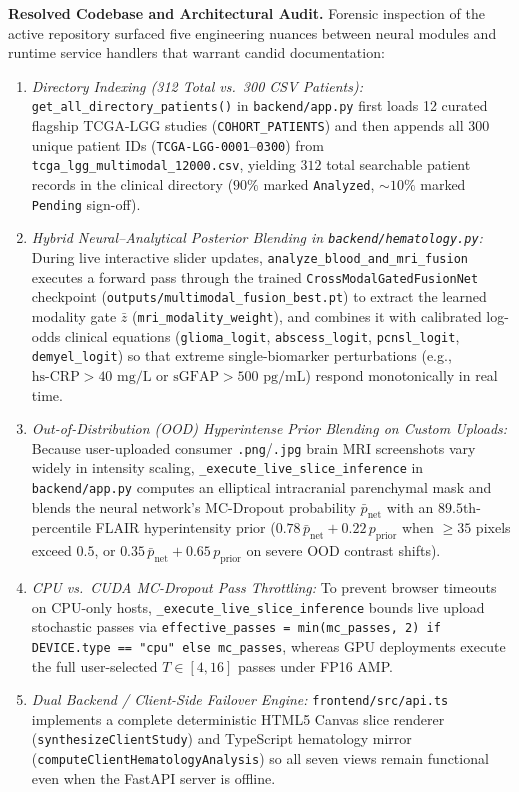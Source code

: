 \documentclass[journal,onecolumn,10pt]{IEEEtran}
\begin{document}
\textbf{Resolved Codebase and Architectural Audit.} Forensic inspection of the active repository surfaced five engineering nuances between neural modules and runtime service handlers that warrant candid documentation:
\begin{enumerate}
    \item \textit{Directory Indexing (312 Total vs.\ 300 CSV Patients):} \texttt{get\_all\_directory\_patients()} in \texttt{backend/app.py} first loads 12 curated flagship TCGA-LGG studies (\texttt{COHORT\_PATIENTS}) and then appends all 300 unique patient IDs (\texttt{TCGA-LGG-0001}--\texttt{0300}) from \texttt{tcga\_lgg\_multimodal\_12000.csv}, yielding $312$ total searchable patient records in the clinical directory ($90\%$ marked \texttt{Analyzed}, $\sim 10\%$ marked \texttt{Pending} sign-off).
    \item \textit{Hybrid Neural--Analytical Posterior Blending in \texttt{backend/hematology.py}:} During live interactive slider updates, \texttt{analyze\_blood\_and\_mri\_fusion} executes a forward pass through the trained \texttt{CrossModalGatedFusionNet} checkpoint (\texttt{outputs/multimodal\_fusion\_best.pt}) to extract the learned modality gate $\bar{z}$ (\texttt{mri\_modality\_weight}), and combines it with calibrated log-odds clinical equations (\texttt{glioma\_logit}, \texttt{abscess\_logit}, \texttt{pcnsl\_logit}, \texttt{demyel\_logit}) so that extreme single-biomarker perturbations (e.g., $\text{hs-CRP} > 40\text{ mg/L}$ or $\text{sGFAP} > 500\text{ pg/mL}$) respond monotonically in real time.
    \item \textit{Out-of-Distribution (OOD) Hyperintense Prior Blending on Custom Uploads:} Because user-uploaded consumer \texttt{.png}/\texttt{.jpg} brain MRI screenshots vary widely in intensity scaling, \texttt{\_execute\_live\_slice\_inference} in \texttt{backend/app.py} computes an elliptical intracranial parenchymal mask and blends the neural network's MC-Dropout probability $\bar{p}_{\text{net}}$ with an $89.5\text{th}$-percentile FLAIR hyperintensity prior ($0.78\,\bar{p}_{\text{net}} + 0.22\,p_{\text{prior}}$ when $\ge 35$ pixels exceed $0.5$, or $0.35\,\bar{p}_{\text{net}} + 0.65\,p_{\text{prior}}$ on severe OOD contrast shifts).
    \item \textit{CPU vs.\ CUDA MC-Dropout Pass Throttling:} To prevent browser timeouts on CPU-only hosts, \texttt{\_execute\_live\_slice\_inference} bounds live upload stochastic passes via \texttt{effective\_passes = min(mc\_passes, 2) if DEVICE.type == "cpu" else mc\_passes}, whereas GPU deployments execute the full user-selected $T \in [4, 16]$ passes under FP16 AMP.
    \item \textit{Dual Backend / Client-Side Failover Engine:} \texttt{frontend/src/api.ts} implements a complete deterministic HTML5 Canvas slice renderer (\texttt{synthesizeClientStudy}) and TypeScript hematology mirror (\texttt{computeClientHematologyAnalysis}) so all seven views remain functional even when the FastAPI server is offline.
\end{enumerate}
\end{document}
